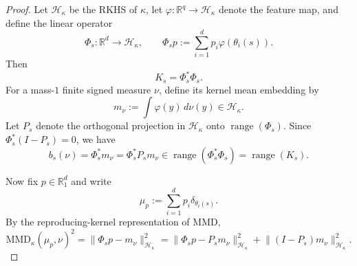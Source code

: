 \documentclass[10pt,a4paper]{amsart}
\begin{document}
\begin{proof}
Let $\mathcal H_\kappa$ be the RKHS of $\kappa$, let $\varphi : \mathbb R^q \to \mathcal H_\kappa$ denote the feature map, and define the linear operator
\begin{equation}
\Phi_s : \mathbb R^d \to \mathcal H_\kappa, \qquad \Phi_s p := \sum_{i=1}^d p_i \varphi(\theta_i(s)).
\end{equation}
Then
\begin{equation}
K_s = \Phi_s^*\Phi_s .
\end{equation}
For a mass-$1$ finite signed measure $\nu$, define its kernel mean embedding by
\begin{equation}
m_\nu := \int \varphi(y)\,d\nu(y) \in \mathcal H_\kappa .
\end{equation}
Let $P_s$ denote the orthogonal projection in $\mathcal H_\kappa$ onto $\operatorname{range}(\Phi_s)$. Since $\Phi_s^*(I-P_s)=0$, we have
\begin{equation}
b_s(\nu) = \Phi_s^* m_\nu = \Phi_s^* P_s m_\nu \in \operatorname{range}(\Phi_s^*\Phi_s) = \operatorname{range}(K_s).
\end{equation}

Now fix $p \in \mathbb R_1^d$ and write
\begin{equation}
\mu_p := \sum_{i=1}^d p_i \delta_{\theta_i(s)} .
\end{equation}
By the reproducing-kernel representation of MMD,
\begin{equation}
\mathrm{MMD}_\kappa(\mu_p,\nu)^2 = \lVert \Phi_s p - m_\nu \rVert_{\mathcal H_\kappa}^2 = \lVert \Phi_s p - P_s m_\nu \rVert_{\mathcal H_\kappa}^2 + \lVert (I-P_s)m_\nu \rVert_{\mathcal H_\kappa}^2 .
\end{equation}


\end{proof}
\end{document}
